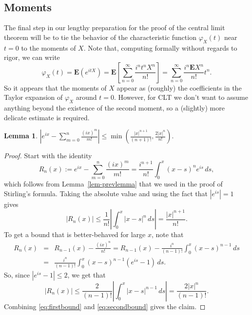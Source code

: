 \documentclass[12pt]{article}
\newtheorem{lem}[thm]{Lemma}
\newcommand{\expec}{\mathbf{E}}
\theoremstyle{example}
\begin{document}
\subsection{Moments}

The final step in our lengthy preparation for the proof of the central limit theorem will be to tie the behavior of the characteristic function $\varphi_X(t)$ near $t=0$ to the moments of $X$. Note that, computing formally without regards to rigor, we can write
$$ \varphi_X(t) = \expec (e^{itX}) = \expec\left[\sum_{n=0}^\infty \frac{i^n t^n X^n}{n!} \right]
= \sum_{n=0}^\infty \frac{i^n \expec X^n}{n!} t^n. $$
So it appears that the moments of $X$ appear as (roughly) the coefficients in the Taylor expansion of $\varphi_X$ around $t=0$. However, for CLT we don't want to assume anything beyond the existence of the second moment, so a (slightly) more delicate estimate is required.

\begin{lem} $\left|e^{ix}-\sum_{m=0}^n \frac{(ix)^m}{m!}\right| \le \min\left(\frac{|x|^{n+1}}{(n+1)!},\frac{2|x|^n}{n!}\right). $
\label{lem-taylor-estimate}
\end{lem}

\begin{proof} Start with the identity
$$ R_n(x) := e^{ix}-\sum_{m=0}^n \frac{(ix)^m}{m!} = \frac{i^{n+1}}{n!}\int_0^x(x-s)^n e^{is}\,ds, $$
which follows from Lemma~\ref{lem-prevlemma} that we used in the proof of Stirling's formula.
Taking the absolute value and using the fact that $|e^{is}|=1$ gives
\begin{equation}\label{eq:firstbound}
|R_n(x)| \le \frac{1}{n!} \left|\int_0^x |x-s|^n\,ds\right| = \frac{|x|^{n+1}}{n!}.
\end{equation}
To get a bound that is better-behaved for large $x$, note that
\begin{eqnarray*} R_n(x) &=& R_{n-1}(x) - \frac{(ix)^n}{n!} = R_{n-1}(x) - \frac{i^n}{(n-1)!}\int_0^x (x-s)^{n-1}\,ds 
\\ &=& \frac{i^n}{(n-1)!}\int_0^x (x-s)^{n-1}(e^{is}-1)\,ds.
\end{eqnarray*}
So, since $|e^{is}-1|\le 2$, we get that
\begin{equation}\label{eq:secondbound}
|R_n(x)| \le \frac{2}{(n-1)!} \left|\int_0^x |x-s|^{n-1}\,ds\right| = \frac{2|x|^{n}}{(n-1)!}.
\end{equation}
Combining \eqref{eq:firstbound} and \eqref{eq:secondbound} gives the claim.
\end{proof}
\end{document}

